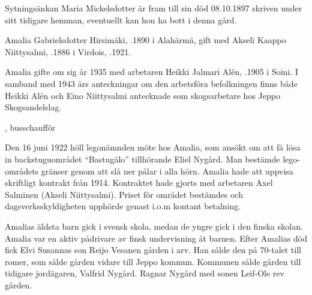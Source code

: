 Sytningsänkan Maria Mickelsdotter är fram till sin död 08.10.1897 skriven under sitt tidigare hemman, eventuellt kan hon ha bott i denna gård.



Amalia Gabrielsdotter Hirsimäki, .1890 i Alahärmä, gift med Akseli Kaappo Niittysalmi, .1886 i Virdois, .1921.

Amalia gifte om sig år 1935 med arbetaren Heikki Jalmari Alén, .1905 i Soini. I samband med 1943 års anteckningar om den arbetsföra befolkningen finns både Heikki Alén och Eino Niittysalmi antecknade som skogsarbetare hos Jeppo Skogsandelslag.
\begin{jhchildren}
  \item {}
  \item {}
  \item {}, busschaufför
  \item {}
  \item {}
  \item {}
  \item {}
  \item {}
\end{jhchildren}

Den 16 juni 1922 höll legonämnden möte hos Amalia, som ansökt om att få lösa in backstuguområdet ``Bastugälo'' tillhörande Eliel Nygård. Man bestämde lego-områdets gränser genom att slå ner pålar i alla hörn. Amalia hade att uppvisa skriftligt kontrakt från 1914. Kontraktet hade gjorts med arbetaren Axel Salminen (Akseli Niittysalmi). Priset för området bestämdes och dagsverksskyldigheten upphörde genast i.o.m kontant betalning.

Amalias äldsta barn gick i svensk skola, medan de yngre gick i den finska skolan. Amalia var en aktiv pådrivare av finsk undervisning åt barnen. Efter Amalias död fick Elvi Susannas son Reijo Vesanen gården i arv. Han sålde den på 70-talet till romer, som sålde gården vidare till Jeppo kommun. Kommunen sålde gården till tidigare jordägaren, Valfrid Nygård. Ragnar Nygård med sonen Leif-Ole rev gården.

